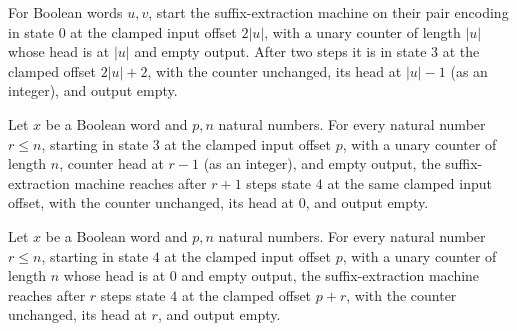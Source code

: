 \begin{lemma}
\label{Complexity.satDrop_separator}
\leanok
{}
For Boolean words $u,v$, start the suffix-extraction machine on their pair encoding in
state $0$ at the clamped input offset $2|u|$, with a unary counter of length $|u|$ whose
head is at $|u|$ and empty output. After two steps it is in state $3$ at the clamped
offset $2|u|+2$, with the counter unchanged, its head at $|u|-1$ (as an integer), and
output empty.
\end{lemma}

\begin{lemma}
\label{Complexity.satDrop_rewind}
\leanok
{}
Let $x$ be a Boolean word and $p,n$ natural numbers. For every natural number $r\le n$,
starting in state $3$ at the clamped input offset $p$, with a unary counter of length
$n$, counter head at $r-1$ (as an integer), and empty output, the suffix-extraction
machine reaches after $r+1$ steps state $4$ at the same clamped input offset, with the
counter unchanged, its head at $0$, and output empty.
\end{lemma}

\begin{lemma}
\label{Complexity.satDrop_skip}
\leanok
{}
Let $x$ be a Boolean word and $p,n$ natural numbers. For every natural number $r\le n$,
starting in state $4$ at the clamped input offset $p$, with a unary counter of length
$n$ whose head is at $0$ and empty output, the suffix-extraction machine reaches after
$r$ steps state $4$ at the clamped offset $p+r$, with the counter unchanged, its head at
$r$, and output empty.
\end{lemma}

